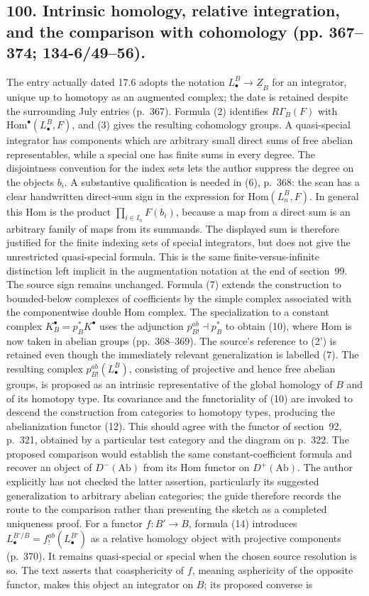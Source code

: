 \documentclass[10pt,oneside]{book}
\begin{document}
\subsection*{100. Intrinsic homology, relative integration, and the comparison with cohomology (pp. 367--374; 134-6/49--56).}
The entry actually dated 17.6 adopts the notation $L^B_{\bullet}\to\underline Z_B$ for an integrator, unique up to homotopy as an augmented complex; the date is retained despite the surrounding July entries (p.~367). Formula (2) identifies $R\Gamma_B(F)$ with $\mathrm{Hom}^{\bullet}(L^B_{\bullet},F)$, and (3) gives the resulting cohomology groups. A quasi-special integrator has components which are arbitrary small direct sums of free abelian representables, while a special one has finite sums in every degree. The disjointness convention for the index sets lets the author suppress the degree on the objects $b_i$. A substantive qualification is needed in (6), p.~368: the scan has a clear handwritten direct-sum sign in the expression for $\mathrm{Hom}(L_n^B,F)$. In general this Hom is the product $\prod_{i\in I_n}F(b_i)$, because a map from a direct sum is an arbitrary family of maps from its summands. The displayed sum is therefore justified for the finite indexing sets of special integrators, but does not give the unrestricted quasi-special formula. This is the same finite-versus-infinite distinction left implicit in the augmentation notation at the end of section~99. The source sign remains unchanged. Formula (7) extends the construction to bounded-below complexes of coefficients by the simple complex associated with the componentwise double Hom complex. The specialization to a constant complex $K_B^{\bullet}=p_B^*K^{\bullet}$ uses the adjunction $p_{B!}^{ab}\dashv p_B^*$ to obtain (10), where Hom is now taken in abelian groups (pp.~368--369). The source's reference to (2') is retained even though the immediately relevant generalization is labelled (7). The resulting complex $p_{B!}^{ab}(L^B_{\bullet})$, consisting of projective and hence free abelian groups, is proposed as an intrinsic representative of the global homology of $B$ and of its homotopy type. Its covariance and the functoriality of (10) are invoked to descend the construction from categories to homotopy types, producing the abelianization functor (12). This should agree with the functor of section~92, p.~321, obtained by a particular test category and the diagram on p.~322. The proposed comparison would establish the same constant-coefficient formula and recover an object of $D^-(\mathrm{Ab})$ from its Hom functor on $D^+(\mathrm{Ab})$. The author explicitly has not checked the latter assertion, particularly its suggested generalization to arbitrary abelian categories; the guide therefore records the route to the comparison rather than presenting the sketch as a completed uniqueness proof. For a functor $f:B'\to B$, formula (14) introduces $L^{B'/B}_{\bullet}=f_!^{ab}(L^{B'}_{\bullet})$ as a relative homology object with projective components (p.~370). It remains quasi-special or special when the chosen source resolution is so. The text asserts that coasphericity of $f$, meaning asphericity of the opposite functor, makes this object an integrator on $B$; its proposed converse is 
\end{document}
